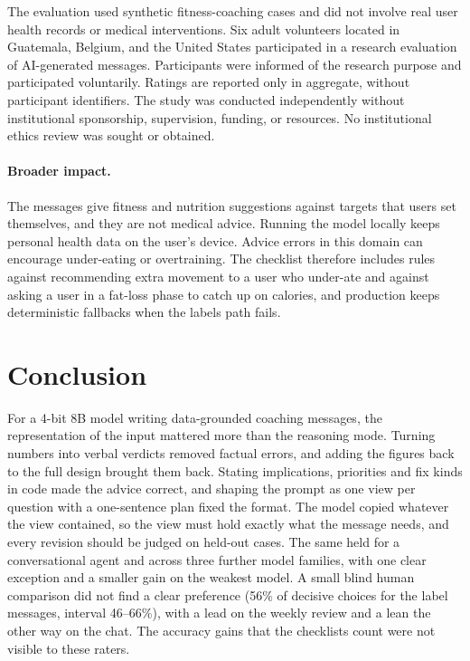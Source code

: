 \documentclass[10pt,twocolumn]{article}
\begin{document}
The evaluation used synthetic fitness-coaching cases and did not involve real user health records or medical
interventions. Six adult volunteers located in Guatemala, Belgium, and the United States participated in a research
evaluation of AI-generated messages. Participants were informed of the research purpose and participated voluntarily.
Ratings are reported only in aggregate, without participant identifiers. The study was conducted independently without
institutional sponsorship, supervision, funding, or resources. No institutional ethics review was sought or obtained.

\paragraph{Broader impact.} The messages give fitness and nutrition suggestions against targets that users set
themselves, and they are not medical advice. Running the model locally keeps personal health data on the user's device.
Advice errors in this domain can encourage under-eating or overtraining.
The checklist therefore includes rules against recommending extra movement to a user who under-ate and against
asking a user in a fat-loss phase to catch up on calories, and production keeps deterministic fallbacks when the
labels path fails.

\section{Conclusion}

For a 4-bit 8B model writing data-grounded coaching messages, the representation of the input mattered more than the
reasoning mode. Turning numbers into verbal verdicts removed factual errors, and adding the figures back to the full design brought
them back. Stating implications, priorities and
fix kinds in code made the advice correct, and shaping the prompt as one view per question with a one-sentence plan
fixed the format. The model copied whatever the view contained, so the view must hold exactly what the message needs,
and every revision should be judged on held-out cases. The same held for a conversational agent and across three further
model families, with one clear exception and a smaller gain on the weakest model. A small blind human comparison did
not find a clear preference (56\% of decisive choices for the label messages, interval 46--66\%), with a lead on the
weekly review and a lean the other way on the chat. The accuracy gains that the checklists count were not visible to
these raters.
\end{document}

